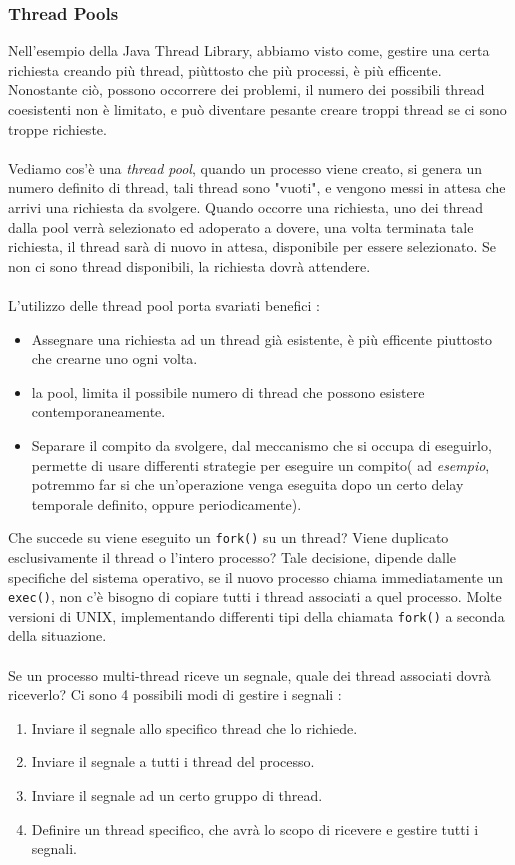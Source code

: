 \documentclass[12pt, letterpaper]{article}
\newcommand{\code}[1]{\colorbox{light-gray}{\texttt{#1}}}
\newcommand{\acc}{\\\hphantom{}\\}
\begin{document}
\subsubsection{Thread Pools}
Nell'esempio della Java Thread Library, abbiamo visto come, gestire una certa richiesta 
creando più thread, piùttosto che più processi, è più efficente. Nonostante ciò, 
possono occorrere dei problemi, il numero dei possibili thread coesistenti 
non è limitato, e può diventare pesante creare troppi thread se ci sono 
troppe richieste.\acc 
Vediamo cos'è una \textit{thread pool}, quando un processo viene creato, 
si genera un numero definito di thread, tali thread sono "vuoti", e vengono messi 
in attesa che arrivi una richiesta da svolgere. Quando occorre una richiesta, uno dei thread 
dalla pool verrà selezionato ed adoperato a dovere, una volta terminata tale richiesta, 
il thread sarà di nuovo in attesa, disponibile per essere selezionato. Se non ci sono 
thread disponibili,  la richiesta dovrà attendere.\acc 
L'utilizzo delle thread pool porta svariati benefici : \begin{itemize}
    \item Assegnare una richiesta ad un thread già esistente, è più 
    efficente piuttosto che crearne uno ogni volta.
    \item la pool, limita il possibile numero di thread che possono 
    esistere contemporaneamente.
    \item Separare il compito da svolgere, dal meccanismo che si occupa di 
    eseguirlo, permette di usare differenti strategie per eseguire un compito(
        ad \textit{esempio}, potremmo far si che un'operazione venga 
        eseguita dopo un certo delay temporale definito, oppure 
        periodicamente).
\end{itemize}
Che succede su viene eseguito un \code{fork()} su un thread? Viene duplicato 
esclusivamente il thread o l'intero processo? Tale decisione, dipende dalle 
specifiche del sistema operativo, se il nuovo processo chiama immediatamente 
un \code{exec()}, non c'è bisogno di copiare tutti i thread associati a quel 
processo. Molte versioni di UNIX, implementando differenti tipi della chiamata
\code{fork()} a seconda della situazione.\acc 
Se un processo multi-thread riceve un segnale, quale dei thread associati dovrà 
riceverlo? Ci sono 4 possibili modi di gestire i segnali : \begin{enumerate}
    \item Inviare il segnale allo specifico thread che lo richiede. 
    \item Inviare il segnale a tutti i thread del processo.
    \item Inviare il segnale ad un certo gruppo di thread.
    \item Definire un thread specifico, che avrà lo scopo di 
    ricevere e gestire tutti i segnali.
\end{enumerate}
\end{document}
